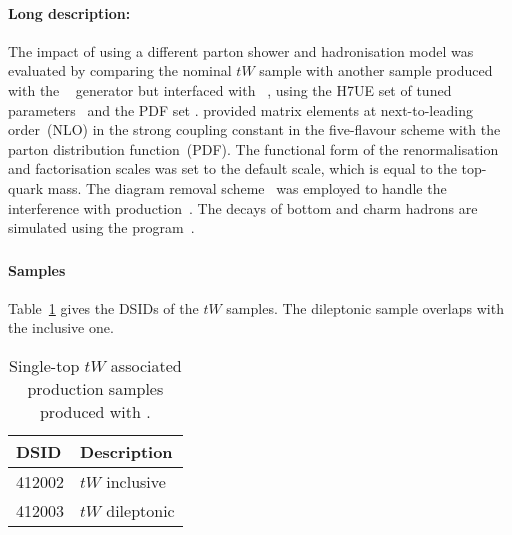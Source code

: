 \paragraph{Long description:}

The impact of using a different parton shower and hadronisation model was evaluated
by comparing the nominal $tW$ sample with another sample produced with the
\POWHEGBOX[v2]~\cite{Re:2010bp,Nason:2004rx,Frixione:2007vw,Alioli:2010xd}
generator but interfaced with \HERWIG[7.04]~\cite{Bahr:2008pv,Bellm:2015jjp},
using the H7UE set of tuned parameters~\cite{Bellm:2015jjp} and the
\MMHT[lo] PDF set \cite{Harland-Lang:2014zoa}.
\POWHEGBOX provided matrix elements at next-to-leading order~(NLO) in the 
strong coupling constant \alphas in the five-flavour scheme with the 
\NNPDF[3.0nlo]~\cite{Ball:2014uwa} parton distribution function~(PDF).  
The functional form of the renormalisation and factorisation scales was set to 
the default scale, which is equal to the top-quark mass.  The diagram removal
scheme~\cite{Frixione:2008yi} was employed to handle the interference
with \ttbar production~\cite{ATL-PHYS-PUB-2016-020}.  The decays of bottom
and charm hadrons are simulated using the \EVTGEN[1.6.0]
program~\cite{Lange:2001uf}.


\subsubsection[MadGraph5\_aMC@NLO+Pythia8]{\MGNLOPY[8]}
\label{subsubsec:tW_aMCP8}

\paragraph{Samples}

Table~\ref{tab:tW_aMCP8} gives the DSIDs of the $tW$ \MGNLOPY[8] samples.
The dileptonic sample overlaps with the inclusive one.

\begin{table}[htbp]
  \caption{Single-top $tW$ associated production samples produced with \MGNLOPY[8].}%
  \label{tab:tW_aMCP8}
  \centering
  \begin{tabular}{l l}
    \toprule
    DSID & Description \\
    \midrule
    412002 & $tW$ inclusive \\
    412003 & $tW$ dileptonic \\
    \bottomrule
  \end{tabular}
\end{table}

